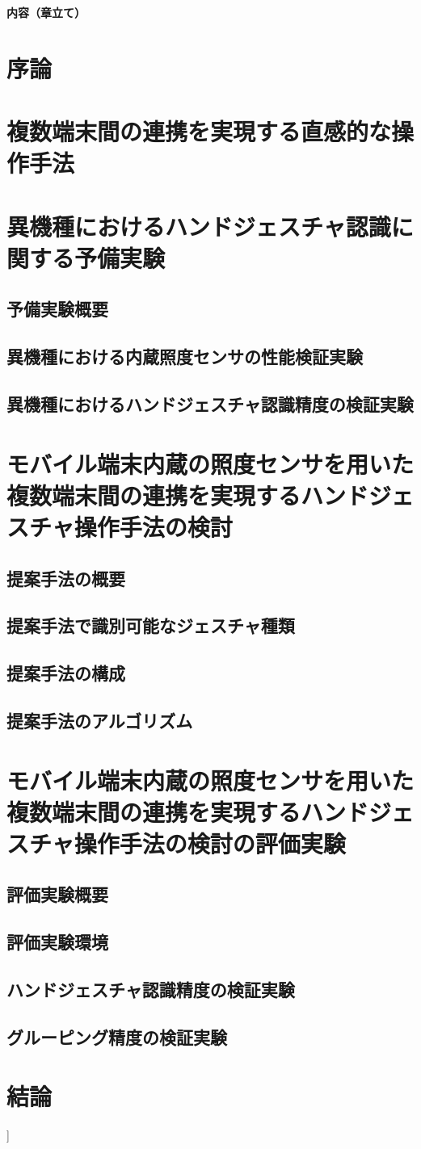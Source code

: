 \documentclass[a4j,9pt,twocolumn]{jsarticle}
\begin{document}
{\large\bfseries 内容（章立て）}
\section{序論}
\section{複数端末間の連携を実現する直感的な操作手法}
\section{異機種におけるハンドジェスチャ認識に関する予備実験}
\subsection{予備実験概要}
\subsection{異機種における内蔵照度センサの性能検証実験}
\subsection{異機種におけるハンドジェスチャ認識精度の検証実験}
\section{モバイル端末内蔵の照度センサを用いた複数端末間の連携を実現するハンドジェスチャ操作手法の検討}
\subsection{提案手法の概要}
\subsection{提案手法で識別可能なジェスチャ種類}
\subsection{提案手法の構成}
\subsection{提案手法のアルゴリズム}
\section{モバイル端末内蔵の照度センサを用いた複数端末間の連携を実現するハンドジェスチャ操作手法の検討の評価実験}
\subsection{評価実験概要}
\subsection{評価実験環境}
\subsection{ハンドジェスチャ認識精度の検証実験}
\subsection{グルーピング精度の検証実験}
\section{結論}
]

\end{document}
